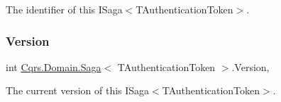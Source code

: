 The identifier of this I\+Saga$<$\+T\+Authentication\+Token$>$. 

\mbox{\label{classCqrs_1_1Domain_1_1Saga_a581e88da4e3e76d3704586f97866a7a6_a581e88da4e3e76d3704586f97866a7a6}} 
\subsubsection{\texorpdfstring{Version}{Version}}
{\footnotesize\ttfamily int \hyperlink{classCqrs_1_1Domain_1_1Saga}{Cqrs.\+Domain.\+Saga}$<$ T\+Authentication\+Token $>$.Version\hspace{0.3cm}{\ttfamily [get]}, {}}



The current version of this I\+Saga$<$\+T\+Authentication\+Token$>$. 


